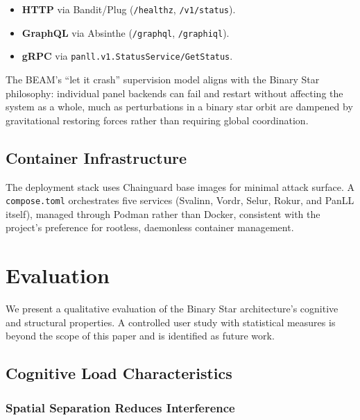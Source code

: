 \documentclass[11pt,a4paper]{article}
\begin{document}
\begin{itemize}
  \item \textbf{HTTP} via Bandit/Plug (\texttt{/healthz},
    \texttt{/v1/status}).
  \item \textbf{GraphQL} via Absinthe (\texttt{/graphql},
    \texttt{/graphiql}).
  \item \textbf{gRPC} via \texttt{panll.v1.StatusService/GetStatus}.
\end{itemize}

The BEAM's ``let it crash'' supervision model aligns with the
Binary Star philosophy: individual panel backends can fail and
restart without affecting the system as a whole, much as
perturbations in a binary star orbit are dampened by gravitational
restoring forces rather than requiring global coordination.

\subsection{Container Infrastructure}

The deployment stack uses Chainguard base images for minimal attack
surface. A \texttt{compose.toml} orchestrates five services
(Svalinn, Vordr, Selur, Rokur, and PanLL itself), managed through
Podman rather than Docker, consistent with the project's
preference for rootless, daemonless container management.

\section{Evaluation}\label{sec:evaluation}

We present a qualitative evaluation of the Binary Star architecture's
cognitive and structural properties. A controlled user study with
statistical measures is beyond the scope of this paper and is
identified as future work.

\subsection{Cognitive Load Characteristics}

\subsubsection{Spatial Separation Reduces Interference}
\end{document}
